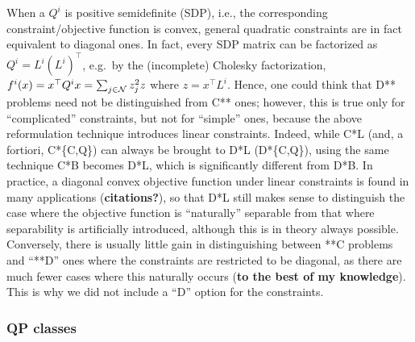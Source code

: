 When a $Q^i$ is positive semidefinite (SDP), i.e., the corresponding constraint/objective function is convex, general quadratic constraints are in fact equivalent to diagonal ones. In fact, every SDP matrix can be factorized as $Q^i = L^i (L^i)^\top$, e.g.~by the (incomplete) Cholesky factorization, $f^i(x) = x^\top Q^i x = \sum_{j \in \mathcal{N}} z^2_jz$ where $z = x^\top L^i$. Hence, one could think that D** problems need not be distinguished from C** ones; however, this is true only for ``complicated'' constraints, but not for ``simple'' ones, because the above reformulation technique introduces linear constraints. Indeed, while C*L (and, a fortiori, C*\{C,Q\}) can always be brought to D*L (D*\{C,Q\}), using the same technique C*B becomes D*L, which is significantly different from D*B. In practice, a diagonal convex objective function under linear constraints is found in many applications ({\bf citations?}), so that D*L still makes sense to distinguish the case where the objective function is ``naturally'' separable from that where separability is artificially introduced, although this is in theory always possible. Conversely, there is usually little gain in distinguishing between **C problems and ``**D'' ones where the constraints are restricted to be diagonal, as there are much fewer cases where this naturally occurs ({\bf to the best of my knowledge}). This is why we did not include a ``D'' option for the constraints.

\subsubsection{QP classes}\label{ssec:classes}

